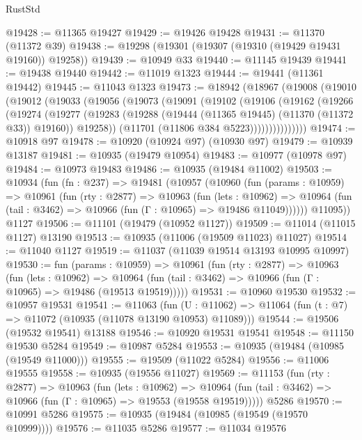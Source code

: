 \begin{lexlean}{RustStd}
\begin{coremodule}
{\begin{coremodule}
{{{{{{{{{{{{{{{{{{{{{{{{{{{{{{{{{{{{{{{{{{{{{{{{{{{{{{{{{{{{{{{{{{{{{{{{{{{{{{{{{{{{{@19428 := @11365 @19427
@19429 := @19426 @19428
@19431 := @11370 (@11372 @39)
@19438 := @19298 (@19301 (@19307 (@19310 (@19429 @19431 @19160)) @19258))
@19439 := @10949 @33
@19440 := @11145 @19439
@19441 := @19438 @19440
@19442 := @11019 @1323
@19444 := @19441 (@11361 @19442)
@19445 := @11043 @1323
@19473 := @18942
    (@18967
      (@19008
        (@19010
          (@19012
            (@19033
              (@19056
                (@19073
                  (@19091
                    (@19102
                      (@19106
                        (@19162
                          (@19266
                            (@19274
                              (@19277
                                (@19283
                                  (@19288 (@19444 (@11365 @19445) (@11370 (@11372 @33)) @19160))
                                  @19258))
                              (@11701 (@11806 @384 @5223)))))))))))))))
@19474 := @10918 @97
@19478 := @10920 (@10924 @97) (@10930 @97)
@19479 := @10939 @13187
@19481 := @10935 (@19479 @10954)
@19483 := @10977 (@10978 @97)
@19484 := @10973 @19483
@19486 := @10935 (@19484 @11002)
@19503 := @10934
    (fun (fn : @237) =>
    @19481
      (@10957
        (@10960
          (fun (params : @10959) =>
          @10961
            (fun (rty : @2877) =>
            @10963
              (fun (lets : @10962) =>
              @10964 (fun (tail : @3462) => @10966 (fun (Γ : @10965) => @19486 @11049))))))
        @11095))
    @1127
@19506 := @11101 (@19479 (@10952 @1127))
@19509 := @11014 (@11015 @1127) @13190
@19513 := @10935 (@11006 (@19509 @11023) @11027)
@19514 := @11040 @1127
@19519 := @11037 (@11039 @19514 @13193 @10995 @10997)
@19530 := fun (params : @10959) =>
  @10961
    (fun (rty : @2877) =>
    @10963
      (fun (lets : @10962) =>
      @10964 (fun (tail : @3462) => @10966 (fun (Γ : @10965) => @19486 (@19513 @19519)))))
@19531 := @10960 @19530
@19532 := @10957 @19531
@19541 := @11063
    (fun (U : @11062) => @11064 (fun (t : @7) => @11072 (@10935 (@11078 @13190 @10953) @11089)))
@19544 := @19506 (@19532 @19541) @13188
@19546 := @10920 @19531 @19541
@19548 := @11150 @19530 @5284
@19549 := @10987 @5284
@19553 := @10935 (@19484 (@10985 (@19549 @11000)))
@19555 := @19509 (@11022 @5284)
@19556 := @11006 @19555
@19558 := @10935 (@19556 @11027)
@19569 := @11153
    (fun (rty : @2877) =>
    @10963
      (fun (lets : @10962) =>
      @10964 (fun (tail : @3462) => @10966 (fun (Γ : @10965) => @19553 (@19558 @19519)))))
    @5286
@19570 := @10991 @5286
@19575 := @10935 (@19484 (@10985 (@19549 (@19570 @10999))))
@19576 := @11035 @5286
@19577 := @11034 @19576
}}}}}}}}}}}}}}}}}}}}}}}}}}}}}}}}}}}}}}}}}}}}}}}}}}}}}}}}}}}}}}}}}}}}}}}}}}}}}}}}}}}}}
\end{coremodule}}
\end{coremodule}
\end{lexlean}
